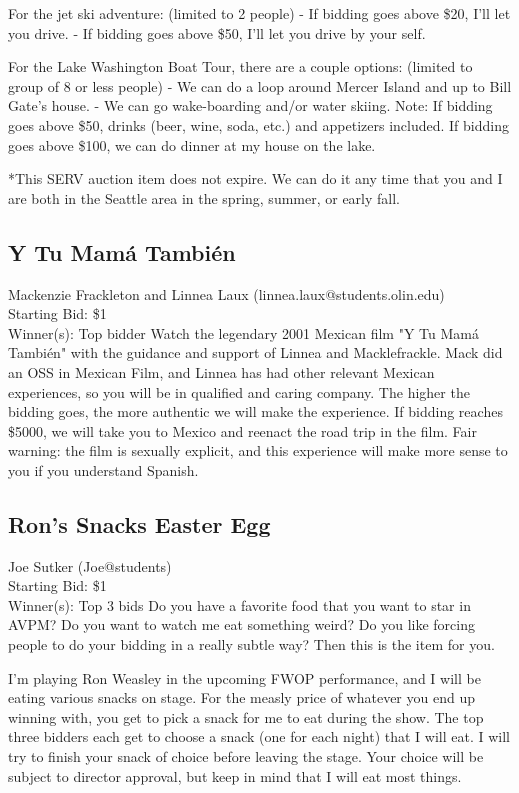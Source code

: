 \documentclass[11pt]{article}
\begin{document}
For the jet ski adventure: (limited to 2 people)
- If bidding goes above \$20, I'll let you drive. 
- If bidding goes above \$50, I'll let you drive by your self.

For the Lake Washington Boat Tour, there are a couple options: (limited to group of 8 or less people)
- We can do a loop around Mercer Island and up to Bill Gate's house. 
- We can go wake-boarding and/or water skiing. 
Note: If bidding goes above \$50, drinks (beer, wine, soda, etc.) and appetizers included. If bidding goes above \$100, we can do dinner at my house on the lake.

*This SERV auction item does not expire. We can do it any time that you and I are both in the Seattle area in the spring, summer, or early fall.
\subsection{Y Tu Mamá También}
Mackenzie Frackleton and Linnea Laux (linnea.laux@students.olin.edu) \\
Starting Bid: \$1 \\
Winner(s): 
Top bidder\newline
Watch the legendary 2001 Mexican film "Y Tu Mamá También" with the guidance and support of Linnea and Macklefrackle. Mack did an OSS in Mexican Film, and Linnea has had other relevant Mexican experiences, so you will be in qualified and caring company.  The higher the bidding goes, the more authentic we will make the experience. If bidding reaches \$5000, we will take you to Mexico and reenact the road trip in the film.
Fair warning: the film is sexually explicit, and this experience will make more sense to you if you understand Spanish.
\subsection{Ron's Snacks Easter Egg}
Joe Sutker (Joe@students) \\
Starting Bid: \$1 \\
Winner(s): 
Top 3 bids\newline
Do you have a favorite food that you want to star in AVPM? Do you want to watch me eat something weird? Do you like forcing people to do your bidding in a really subtle way? Then this is the item for you.

I'm playing Ron Weasley in the upcoming FWOP performance, and I will be eating various snacks on stage. For the measly price of whatever you end up winning with, you get to pick a snack for me to eat during the show. The top three bidders each get to choose a snack (one for each night) that I will eat. I will try to finish your snack of choice before leaving the stage. Your choice will be subject to director approval, but keep in mind that I will eat most things.
\end{document}
